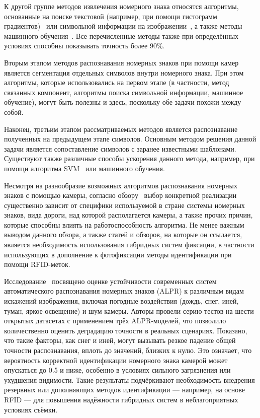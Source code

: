 \documentclass[12pt]{article}
\theoremstyle{definition}
\begin{document}
К другой группе методов извлечения номерного знака относятся алгоритмы, основанные на поиске текстовой (например, при помощи гистограмм градиентов)~\cite{teoh2015performance} или символьной информации на изображении~\cite{cho2011license}, а также методы машинного обучения~\cite{laroca2018robust}. Все перечисленные методы также при определённых условиях способны показывать точность более $90\%$.

Вторым этапом методов распознавания номерных знаков при помощи камер является сегментация отдельных символов внутри номерного знака. При этом алгоритмы, которые использовались на первом этапе (в частности, метод связанных компонент, алгоритмы поиска символьной информации, машинное обучение), могут быть полезны и здесь, поскольку обе задачи похожи между собой.

Наконец, третьим этапом рассматриваемых методов является распознавание полученных на предыдущем этапе символов. Основным методом решения данной задачи является сопоставление символов с заранее известными шаблонами.~\cite{jia2016design} Существуют также различные способы ускорения данного метода, например, при помощи алгоритма SVM~\cite{9199828} или машинного обучения.

Несмотря на разнообразие возможных алгоритмов распознавания номерных знаков с помощью камеры, согласно обзору~\cite{lubna2021automatic} выбор конкретной реализации существенно зависит от специфики используемой в стране системы номерных знаков, вида дороги, над которой располагается камеры, а также прочих причин, которые способны влиять на работоспособность алгоритма. Не менее важным выводом данного обзора, а также статей и обзоров, на которые он ссылается, является необходимость использования гибридных систем фиксации, в частности использующих в дополнение к фотофиксации методы идентификации при помощи RFID-меток.

Исследование~\cite{Plavac2024} посвящено оценке устойчивости современных систем автоматического распознавания номерных знаков (ALPR) к различным видам искажений изображения, включая погодные воздействия (дождь, снег, иней, туман, яркое освещение) и шум камеры. Авторы провели серию тестов на шести открытых датасетах с применением трёх ALPR-моделей, что позволило количественно оценить деградацию точности в реальных сценариях. Показано, что такие факторы, как снег и иней, могут вызывать резкое падение общей точности распознавания, вплоть до значений, близких к нулю. Это означает, что вероятность корректной идентификации номерного знака камерой может опускаться до 0.5 и ниже, особенно в условиях сильного загрязнения или ухудшения видимости. Такие результаты подчёркивают необходимость внедрения резервных или дополняющих методов идентификации — например, на основе RFID — для повышения надёжности гибридных систем в неблагоприятных условиях съёмки.
\end{document}
